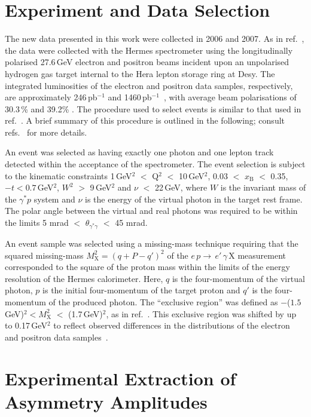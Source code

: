 \section{Experiment and Data Selection}
The new data presented in this work were collected in 2006 and 2007. As in ref.~\cite{Air09}, the data were collected with the H{\sc ermes}
spectrometer \cite{Ack98} using the longitudinally polarised 27.6\,GeV
electron and positron beams incident upon an unpolarised hydrogen gas
target internal to the H{\sc era} lepton storage ring at D{\sc esy}. The integrated luminosities of the electron and positron data samples, respectively, are
approximately 246\,pb$^{-1}$ and 1460\,pb$^{-1}$~\cite{Ben01}, with average beam polarisations of 30.3\,\% and 39.2\% \cite{tpol,lpol}. The procedure used to select events is similar to that used in ref.~\cite{Air09}.
A brief summary of this procedure is outlined in the following; consult
refs.~\cite{Zei09,Bur10} for more details. 

An event
was selected as having exactly one photon and one lepton
track detected within the acceptance of the spectrometer.
The event selection is subject to the kinematic constraints 1\,GeV$^{2}$ $<$
Q$^{2}$ $<$ 10\,GeV$^{2}$, 0.03 $<$ $x_{\textrm{B}}$ $<$ 0.35,
$-t < 0.7$\,GeV$^2$, $W^{2}$ $>$
9\,GeV$^{2}$ and $\nu$ $<$ 22\,GeV, where $W$ is the invariant mass of the
$\gamma^{*}p$ system and $\nu$ is the energy of the virtual photon in the target
rest frame. The polar angle between the virtual and real photons was required to
be within the limits 5 mrad $<$
$\theta_{\gamma^{*}\gamma}$ $<$ 45 mrad. 

An event sample was selected using a missing-mass technique requiring
that the squared missing-mass $M_{\textrm{X}}^{2}=(q+P-q')^{2}$
of the $e\,p \rightarrow\, e'\,\gamma\, \textrm{X}$ measurement
corresponded to the square of the proton mass within the limits of the
energy resolution of the H{\sc ermes} calorimeter. Here, $q$ is the
four-momentum of the virtual photon, $p$ is the initial four-momentum
of the target proton and $q'$ is the four-momentum of the produced
photon. The ``exclusive region'' was defined as $-$($1.5$\,GeV)$^{2} <
M_{\textrm{X}}^{2}$ $<$ (1.7\,GeV)$^{2}$, as in
ref.~\cite{Air09}. This exclusive region was shifted by up to
0.17\,GeV$^{2}$ to reflect observed differences in the distributions of the electron and positron data samples~\cite{Bur10}. 

\section{Experimental Extraction of Asymmetry Amplitudes}

